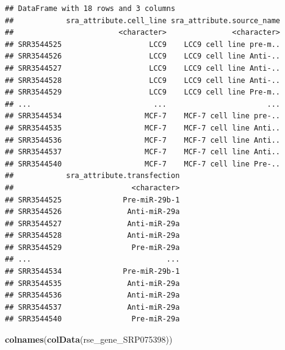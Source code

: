 \documentclass[
]{article}
\newenvironment{Shaded}{\begin{snugshade}}{\end{snugshade}}
\newcommand{\FunctionTok}[1]{\textcolor[rgb]{0.13,0.29,0.53}{\textbf{#1}}}
\newcommand{\NormalTok}[1]{#1}
\begin{document}
\begin{verbatim}
## DataFrame with 18 rows and 3 columns
##            sra_attribute.cell_line sra_attribute.source_name
##                        <character>               <character>
## SRR3544525                    LCC9    LCC9 cell line pre-m..
## SRR3544526                    LCC9    LCC9 cell line Anti-..
## SRR3544527                    LCC9    LCC9 cell line Anti-..
## SRR3544528                    LCC9    LCC9 cell line Anti-..
## SRR3544529                    LCC9    LCC9 cell line Pre-m..
## ...                            ...                       ...
## SRR3544534                   MCF-7    MCF-7 cell line pre-..
## SRR3544535                   MCF-7    MCF-7 cell line Anti..
## SRR3544536                   MCF-7    MCF-7 cell line Anti..
## SRR3544537                   MCF-7    MCF-7 cell line Anti..
## SRR3544540                   MCF-7    MCF-7 cell line Pre-..
##            sra_attribute.transfection
##                           <character>
## SRR3544525              Pre-miR-29b-1
## SRR3544526               Anti-miR-29a
## SRR3544527               Anti-miR-29a
## SRR3544528               Anti-miR-29a
## SRR3544529                Pre-miR-29a
## ...                               ...
## SRR3544534              Pre-miR-29b-1
## SRR3544535               Anti-miR-29a
## SRR3544536               Anti-miR-29a
## SRR3544537               Anti-miR-29a
## SRR3544540                Pre-miR-29a
\end{verbatim}

\begin{Shaded}
\begin{Highlighting}[]
\FunctionTok{colnames}\NormalTok{(}\FunctionTok{colData}\NormalTok{(rse\_gene\_SRP075398))}
\end{Highlighting}
\end{Shaded}
\end{document}
